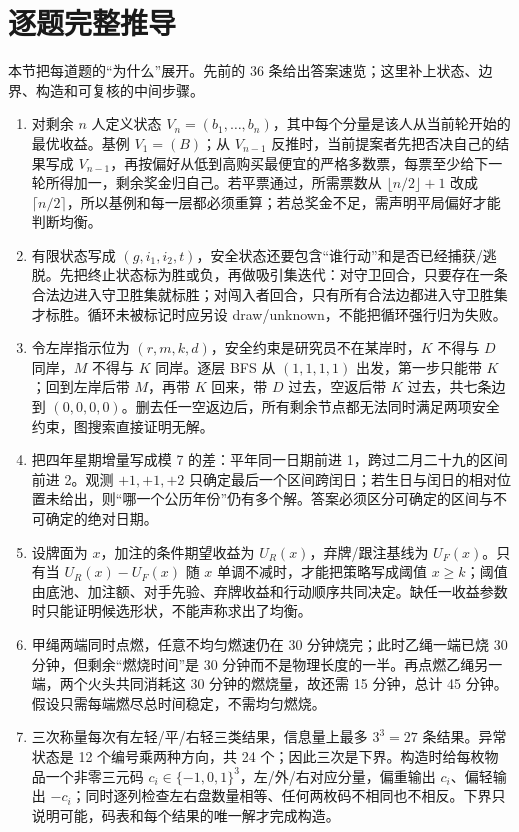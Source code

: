 \section*{逐题完整推导}
本节把每道题的“为什么”展开。先前的 36 条给出答案速览；这里补上状态、边界、构造和可复核的中间步骤。
\begin{enumerate}[leftmargin=*]
  \item 对剩余 $n$ 人定义状态 $V_n=(b_1,\ldots,b_n)$，其中每个分量是该人从当前轮开始的最优收益。基例 $V_1=(B)$；从 $V_{n-1}$ 反推时，当前提案者先把否决自己的结果写成 $V_{n-1}$，再按偏好从低到高购买最便宜的严格多数票，每票至少给下一轮所得加一，剩余奖金归自己。若平票通过，所需票数从 $\lfloor n/2\rfloor+1$ 改成 $\lceil n/2\rceil$，所以基例和每一层都必须重算；若总奖金不足，需声明平局偏好才能判断均衡。
  \item 有限状态写成 $(g,i_1,i_2,t)$，安全状态还要包含“谁行动”和是否已经捕获/逃脱。先把终止状态标为胜或负，再做吸引集迭代：对守卫回合，只要存在一条合法边进入守卫胜集就标胜；对闯入者回合，只有所有合法边都进入守卫胜集才标胜。循环未被标记时应另设 draw/unknown，不能把循环强行归为失败。
  \item 令左岸指示位为 $(r,m,k,d)$，安全约束是研究员不在某岸时，$K$ 不得与 $D$ 同岸，$M$ 不得与 $K$ 同岸。逐层 BFS 从 $(1,1,1,1)$ 出发，第一步只能带 $K$；回到左岸后带 $M$，再带 $K$ 回来，带 $D$ 过去，空返后带 $K$ 过去，共七条边到 $(0,0,0,0)$。删去任一空返边后，所有剩余节点都无法同时满足两项安全约束，图搜索直接证明无解。
  \item 把四年星期增量写成模 7 的差：平年同一日期前进 1，跨过二月二十九的区间前进 2。观测 $+1,+1,+2$ 只确定最后一个区间跨闰日；若生日与闰日的相对位置未给出，则“哪一个公历年份”仍有多个解。答案必须区分可确定的区间与不可确定的绝对日期。
  \item 设牌面为 $x$，加注的条件期望收益为 $U_R(x)$，弃牌/跟注基线为 $U_F(x)$。只有当 $U_R(x)-U_F(x)$ 随 $x$ 单调不减时，才能把策略写成阈值 $x\ge k$；阈值由底池、加注额、对手先验、弃牌收益和行动顺序共同决定。缺任一收益参数时只能证明候选形状，不能声称求出了均衡。
  \item 甲绳两端同时点燃，任意不均匀燃速仍在 30 分钟烧完；此时乙绳一端已烧 30 分钟，但剩余“燃烧时间”是 30 分钟而不是物理长度的一半。再点燃乙绳另一端，两个火头共同消耗这 30 分钟的燃烧量，故还需 15 分钟，总计 45 分钟。假设只需每端燃尽总时间稳定，不需均匀燃烧。
  \item 三次称量每次有左轻/平/右轻三类结果，信息量上最多 $3^3=27$ 条结果。异常状态是 12 个编号乘两种方向，共 24 个；因此三次是下界。构造时给每枚物品一个非零三元码 $c_i\in\{-1,0,1\}^3$，左/外/右对应分量，偏重输出 $c_i$、偏轻输出 $-c_i$；同时逐列检查左右盘数量相等、任何两枚码不相同也不相反。下界只说明可能，码表和每个结果的唯一解才完成构造。

\end{enumerate}
